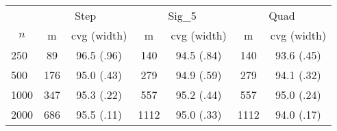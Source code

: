 \begin{tabular}{lcccccc}
   \toprule
 
           & \multicolumn{2}{c}{Step}& \multicolumn{2}{c}{Sig\_5}& \multicolumn{2}{c}{Quad} \\ 
             \cmidrule(l{2pt}r{2pt}){2-3} \cmidrule(l{2pt}r{2pt}){4-5} \cmidrule(l{2pt}r{2pt}){6-7} 
             \multicolumn{1}{c}{$n$} & \multicolumn{1}{c}{m}& \multicolumn{1}{c}{cvg (width)}& \multicolumn{1}{c}{m}& \multicolumn{1}{c}{cvg (width)}& \multicolumn{1}{c}{m}& \multicolumn{1}{c}{cvg (width)} \\ \midrule 
        250 & 89 & 96.5 (.96) & 140 & 94.5 (.84) & 140 & 93.6 (.45) \\ 
  500 & 176 & 95.0 (.43) & 279 & 94.9 (.59) & 279 & 94.1 (.32) \\ 
  1000 & 347 & 95.3 (.22) & 557 & 95.2 (.44) & 557 & 95.0 (.24) \\ 
  2000 & 686 & 95.5 (.11) & 1112 & 95.0 (.33) & 1112 & 94.0 (.17) \\ 
   \hline
\end{tabular}
